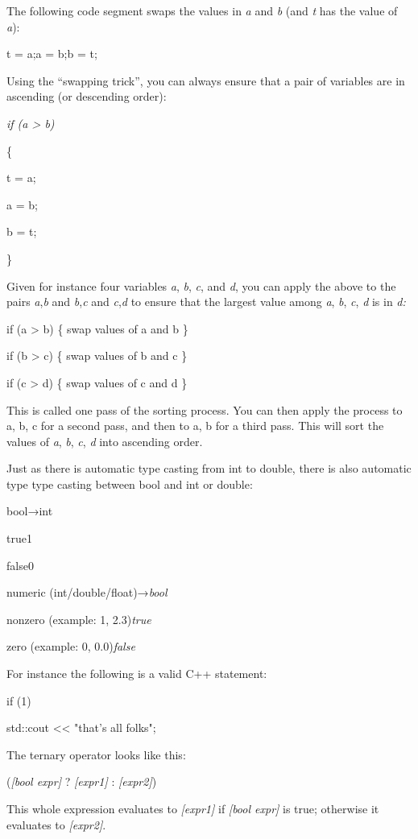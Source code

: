 \documentclass[
]{article}
\begin{document}
The following code segment swaps the values in \emph{a} and \emph{b}
(and \emph{t} has the value of \emph{a}):

t = a;a = b;b = t;

Using the ``swapping trick'', you can always ensure that a pair of
variables are in ascending (or descending order):

\emph{if (a \textgreater{} b)}

\{

t = a;

a = b;

b = t;

\}

Given for instance four variables \emph{a}, \emph{b}, \emph{c}, and
\emph{d}, you can apply the above to the pairs \emph{a},\emph{b} and
\emph{b},\emph{c} and \emph{c},\emph{d} to ensure that the largest value
among \emph{a}, \emph{b}, \emph{c}, \emph{d} is in \emph{d:}

if (a \textgreater{} b) \{ swap values of a and b \}

if (b \textgreater{} c) \{ swap values of b and c \}

if (c \textgreater{} d) \{ swap values of c and d \}

This is called one pass of the sorting process. You can then apply the
process to a, b, c for a second pass, and then to a, b for a third pass.
This will sort the values of \emph{a}, \emph{b}, \emph{c}, \emph{d} into
ascending order.

Just as there is automatic type casting from int to double, there is
also automatic type type casting between bool and int or double:

bool→int

true1

false0

numeric (int/double/float)→\emph{bool}

nonzero (example: 1, 2.3)\emph{true}

zero (example: 0, 0.0)\emph{false}

For instance the following is a valid C++ statement:

if (1)

std::cout \textless\textless{} "that's all folks";

The ternary operator looks like this:

(\emph{{[}bool expr{]}} ? \emph{{[}expr1{]}} : \emph{{[}expr2{]}})

This whole expression evaluates to \emph{{[}expr1{]}} if \emph{{[}bool
expr{]}} is true; otherwise it evaluates to \emph{{[}expr2{]}}.
\end{document}
